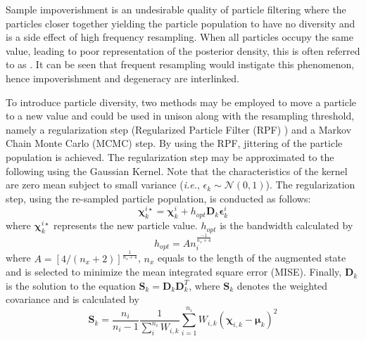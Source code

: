 \documentclass[onecolumn,journal,draftclsnofoot]{IEEEtran}
\begin{document}
Sample impoverishment is an undesirable quality of particle filtering where the particles  closer together yielding the particle population to have no diversity and is a side effect of high frequency resampling.
When all particles occupy the same value, leading to poor representation of the posterior density, this is often referred to as . 
It can be seen that frequent resampling  would instigate this phenomenon, hence impoverishment and degeneracy are interlinked. 

To introduce particle diversity, two methods may be employed to move a particle to a new value and could be used in unison along with the resampling threshold, namely a regularization step (Regularized Particle Filter (RPF) \cite{Arulampalam2002}) and a Markov Chain Monte Carlo (MCMC) step. 
By using the RPF, jittering of the particle population is achieved.
The regularization step may be approximated to the following using the Gaussian Kernel. Note that the characteristics of the kernel are zero mean subject to small variance (\emph{i.e.}, \(\epsilon_k \sim \mathcal{N}\left(0,1\right)\)). 
The regularization step, using the re-sampled particle population, is conducted as follows: 
\begin{equation}
    \mathbf{\chi}^{i\star}_k = \mathbf{\chi}^{i}_k + h_{opt} \mathbf{D}_k \mathbf{\epsilon}^i_k
\end{equation}
where \(\mathbf{\chi}^{i\star}_k\) represents the new particle value. \(h_{opt}\) is the bandwidth calculated by 
\begin{equation}
    h_{opt} = An_i^{\frac{-1}{n_x+4}}        
\end{equation}
where $A = \left[4/ \left(n_x+2 \right) \right] ^{\frac{1}{n_x+4}}$,  \(n_x\) equals to the length of the augmented state and is selected to minimize the mean integrated square error (MISE). 
Finally, \(\mathbf{D}_k\) is the solution to the equation \(\mathbf{S}_k = \mathbf{D}_k \mathbf{D}_k^T\), where $\mathbf{S}_k$ denotes the weighted covariance and is calculated by
\begin{equation}
    \mathbf{S}_k=\frac{n_i}{n_i-1} \frac{1}{\sum_{i}^{n_{i}} W_{i,k}} \sum_{i=1}^{n_i} W_{i,k}\left(\mathbf{\chi}_{i,k}-\mathbf{\mu}_{k}\right)^{2}
\end{equation}
\end{document}
